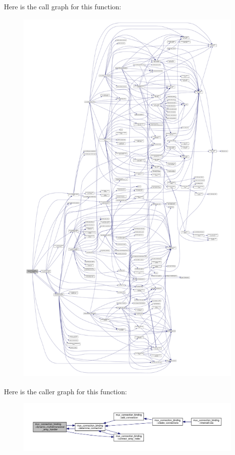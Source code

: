 Here is the call graph for this function\+:
\nopagebreak
\begin{figure}[H]
\begin{center}
\leavevmode
\includegraphics[height=550pt]{d7/d1e/classmux__connection__binding_a89ede1ce1d15207461df7fdf816a4a16_cgraph}
\end{center}
\end{figure}
Here is the caller graph for this function\+:
\nopagebreak
\begin{figure}[H]
\begin{center}
\leavevmode
\includegraphics[width=350pt]{d7/d1e/classmux__connection__binding_a89ede1ce1d15207461df7fdf816a4a16_icgraph}
\end{center}
\end{figure}
\mbox{\label{classmux__connection__binding_af62b7f65acce2f389f49634b980c88a6}} 
